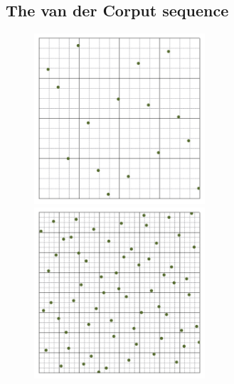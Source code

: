\documentclass[11pt,fleqn]{book} %
\begin{document}
\subsection{The van der Corput sequence}
%
\begin{figure}[!h]
  \centering
  \includegraphics[width=2.5in]{Pictures/pointset-gridvisualize/points-halton-n16.pdf}
    \includegraphics[width=2.5in]{./Pictures/pointset-gridvisualize/points-halton-n64.pdf}
%
%
  

\end{figure}
\end{document}
